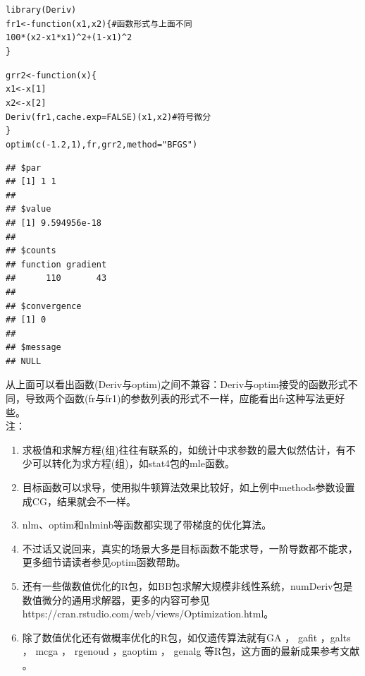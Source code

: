\documentclass[a4paper]{ctexart}\usepackage[]{graphicx}\usepackage[]{color}
\makeatletter
\newcommand{\hlnum}[1]{\textcolor[rgb]{0.502,0.086,1}{#1}}%
\newcommand{\hlstr}[1]{\textcolor[rgb]{1,0.4,0.2}{#1}}%
\newcommand{\hlcom}[1]{\textcolor[rgb]{1,0.251,0.502}{#1}}%
\newcommand{\hlopt}[1]{\textcolor[rgb]{0.251,0.251,0.251}{#1}}%
\newcommand{\hlstd}[1]{\textcolor[rgb]{0.251,0.251,0.251}{#1}}%
\newcommand{\hlkwa}[1]{\textcolor[rgb]{0.941,0.188,0.816}{#1}}%
\newcommand{\hlkwb}[1]{\textcolor[rgb]{0,0.439,0.902}{#1}}%
\newcommand{\hlkwc}[1]{\textcolor[rgb]{0.188,0.941,0.314}{#1}}%
\newcommand{\hlkwd}[1]{\textcolor[rgb]{0.69,0.188,0.941}{#1}}%
\newenvironment{kframe}{%
 \def\at@end@of@kframe{}%
 \ifinner\ifhmode%
  \def\at@end@of@kframe{\end{minipage}}%
  \begin{minipage}{\columnwidth}%
 \fi\fi%
 \def\FrameCommand##1{\hskip\@totalleftmargin \hskip-\fboxsep
 \colorbox{shadecolor}{##1}\hskip-\fboxsep
     \hskip-\linewidth \hskip-\@totalleftmargin \hskip\columnwidth}%
 \MakeFramed {\advance\hsize-\width
   \@totalleftmargin\z@ \linewidth\hsize
   \@setminipage}}%
 {\par\unskip\endMakeFramed%
 \at@end@of@kframe}
\newenvironment{knitrout}{}{} %
\makeatother
\begin{document}
\begin{knitrout}
\color{fgcolor}\begin{kframe}
\begin{alltt}
\hlkwd{library}\hlstd{(Deriv)}
\hlstd{fr1} \hlkwb{<-} \hlkwa{function}\hlstd{(}\hlkwc{x1}\hlstd{,}\hlkwc{x2}\hlstd{) \{} \hlcom{# 函数形式与上面不同}
  \hlnum{100} \hlopt{*} \hlstd{(x2} \hlopt{-} \hlstd{x1} \hlopt{*} \hlstd{x1)}\hlopt{^}\hlnum{2} \hlopt{+} \hlstd{(}\hlnum{1} \hlopt{-} \hlstd{x1)}\hlopt{^}\hlnum{2}
\hlstd{\}}

\hlstd{grr2} \hlkwb{<-} \hlkwa{function}\hlstd{(}\hlkwc{x}\hlstd{) \{}
  \hlstd{x1} \hlkwb{<-} \hlstd{x[}\hlnum{1}\hlstd{]}
  \hlstd{x2} \hlkwb{<-} \hlstd{x[}\hlnum{2}\hlstd{]}
  \hlkwd{Deriv}\hlstd{(fr1,}\hlkwc{cache.exp} \hlstd{=} \hlnum{FALSE}\hlstd{)(x1,x2)} \hlcom{# 符号微分}
\hlstd{\}}
\hlkwd{optim}\hlstd{(}\hlkwd{c}\hlstd{(}\hlopt{-}\hlnum{1.2}\hlstd{,} \hlnum{1}\hlstd{), fr, grr2,} \hlkwc{method} \hlstd{=} \hlstr{"BFGS"}\hlstd{)}
\end{alltt}
\begin{verbatim}
## $par
## [1] 1 1
## 
## $value
## [1] 9.594956e-18
## 
## $counts
## function gradient 
##      110       43 
## 
## $convergence
## [1] 0
## 
## $message
## NULL
\end{verbatim}
\end{kframe}
\end{knitrout}
从上面可以看出函数(Deriv与optim)之间不兼容：Deriv与optim接受的函数形式不同，导致两个函数(fr与fr1)的参数列表的形式不一样，应能看出fr这种写法更好些。
\\
注：
\begin{enumerate}
  \item 求极值和求解方程(组)往往有联系的，如统计中求参数的最大似然估计，有不少可以转化为求方程(组)，如stat4包\cite{R-core}的mle函数。  
  \item 目标函数可以求导，使用拟牛顿算法效果比较好，如上例中methods参数设置成CG，结果就会不一样。
  \item nlm、optim和nlminb等函数都实现了带梯度的优化算法。
  \item 不过话又说回来，真实的场景大多是目标函数不能求导，一阶导数都不能求，更多细节请读者参见optim函数帮助。
  \item 还有一些做数值优化的R包，如BB包\cite{BB}求解大规模非线性系统，numDeriv包是数值微分的通用求解器，更多的内容可参见https://cran.rstudio.com/web/views/Optimization.html。
  \item 除了数值优化还有做概率优化的R包，如仅遗传算法就有GA \cite{R-GA}， gafit \cite{R-gafit}，galts \cite{R-galts}， mcga \cite{R-mcga}， rgenoud \cite{R-rgenoud}，gaoptim \cite{R-gaoptim}， genalg \cite{R-genalg}等R包，这方面的最新成果参考文献 \cite{2016arXiv160501931S}。
\end{enumerate}
\end{document}

